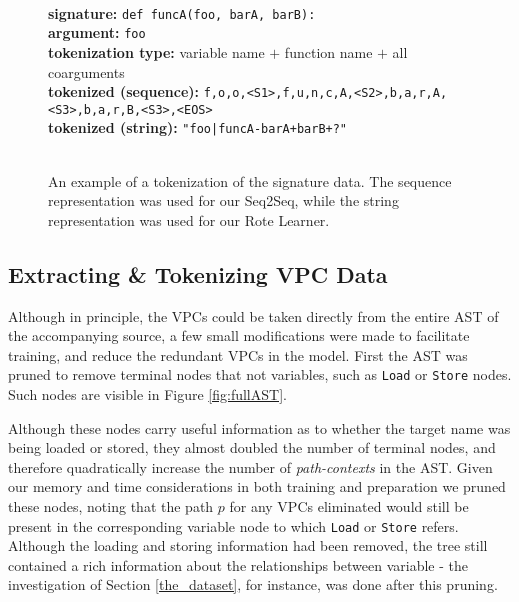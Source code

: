 \begin{figure}[h!]

\hrulefill\\
    \textbf{signature:} \texttt{def funcA(foo, barA, barB):}\\
    \textbf{argument:} \texttt{foo} \\
    \textbf{tokenization type:} variable name $+$ function name $+$ all coarguments \\
    \textbf{tokenized (sequence):} \texttt{f,o,o,<S1>,f,u,n,c,A,<S2>,b,a,r,A,<S3>,b,a,r,B,<S3>,<EOS>}\\
    \textbf{tokenized (string):} \texttt{"foo|funcA-barA+barB+?"}\\
\hrulefill\\ 
    \caption{An example of a tokenization of the signature data. The sequence representation was used for our Seq2Seq, while the string representation was used for our Rote Learner.}
    \label{fig:tokenizatio}
\end{figure}

\subsection{Extracting \& Tokenizing VPC Data }
\label{sub:code_tokenization}
Although in principle, the VPCs could be taken directly from the entire AST of the accompanying source, a few small modifications were made to facilitate training, and reduce the redundant VPCs in the model. 
First the AST was pruned to remove terminal nodes that not variables, such as \texttt{Load} or \texttt{Store} nodes. Such nodes are visible in Figure \ref{fig:fullAST}. 

Although these nodes carry useful information as to whether the target name was being loaded or stored, they almost doubled the number of terminal nodes, and therefore quadratically increase the number of \textit{path-contexts} in the AST. Given our memory and time considerations in both training and preparation we pruned these nodes, noting that the path $p$ for any VPCs eliminated would still be present in the corresponding variable node to which \texttt{Load} or \texttt{Store} refers. 
Although the loading and storing information had been removed, the tree still contained a rich information about the relationships between variable - the investigation of Section \ref{the_dataset}, for instance, was done after this pruning.


